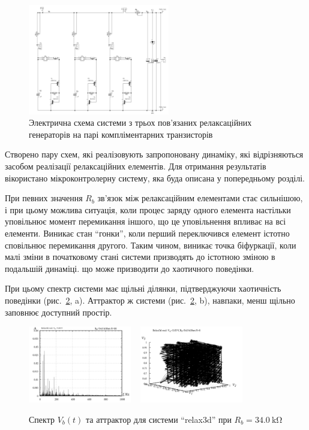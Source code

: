 \documentclass[a4paper,13pt]{atuaref}
\begin{document}
\begin{figure}[htb!]
  \centerline{\includegraphics[width=0.55\textwidth]{p7/p/relax3d_schem.png} }
  \caption{Электрична схема системи з трьох пов'язаних релаксаційних генераторів на парі компліментарних транзисторів}
  \label{atu:f:relax3d_schem}
\end{figure}


Створено пару схем,
які реалізовують запропоновану динаміку, які відрізняються
засобом реалізації релаксаційних елементів.
Для отримання результатів вікористано мікроконтролерну систему,
яка буда описана у попередньому розділі.

При певних значення $ R_b $ зв'язок між релаксаційним елементами стає сильнішою,
і при цьому можлива ситуація, коли
процес заряду одного елемента настільки уповільнює момент перемикання іншого,
що це уповільнення впливає на всі елементи. Виникає стан ``гонки'', коли
перший переключився елемент істотно сповільнює перемикання другого. Таким
чином, виникає точка біфуркації, коли малі зміни в початковому стані системи
призводять до істотною зміною в подальшій динаміці. що може призводити до
хаотичного поведінки.

При цьому спектр системи має щільні ділянки, підтверджуючи хаотичність
поведінки (рис.~\ref{atu:f:relax3d_f_08}, a). Аттрактор ж системи
(рис.~\ref{atu:f:relax3d_f_08}, b), навпаки, менш щільно заповнює
доступний простір.

\begin{figure}[htb!]
  \centerline{
    \includegraphics[width=0.40\textwidth]{p7/p/relax3d_f_08.png}
    ~
    \includegraphics[width=0.40\textwidth]{p7/p/relax3d_v1v2v3_08.png}
  }
  \caption{Спектр $V_b(t)$ та аттрактор для системи ``relax3d'' при $R_b=\SI{34.0}{\kilo\ohm}$ }
  \label{atu:f:relax3d_f_08}
\end{figure}
\end{document}
